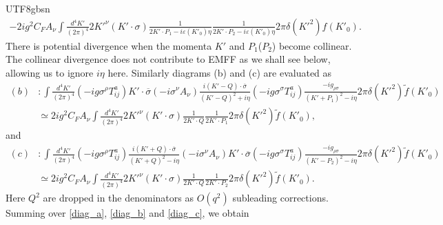 \documentclass[11pt]{article}\def\baselinestretch{1.4}
\def\h{\eta}
\begin{document}
\begin{CJK}{UTF8}{gbsn}
\begin{align}\label{diag_a}
   -2ig^2C_F A_\nu \int\frac{d^{4} K'}{( 2\pi )^{4}} 2K'^\nu (K' \cdot \sigma) \frac{1}{2K'\cdot P_1-i \varepsilon(K'_0)\eta}\frac{1}{2K'\cdot P_2-i \varepsilon(K'_0)\eta}2\pi \delta (K'^2)f(K'_0).
\end{align}
There is potential divergence when the momenta $K'$ and $P_1$($P_2$) become collinear. The collinear divergence does not contribute to EMFF as we shall see below, allowing us to ignore $i\h$ here. Similarly diagrams (b) and (c) are evaluated as
\begin{align}\label{diag_b}
   (b)&:\int \frac{d^{4} K'}{( 2\pi )^{4}}\left( -ig\sigma ^{\rho } T_{ij}^{a}\right)K' \cdot \overline{\sigma}\left( -i\sigma ^{\nu } A_{\nu }\right)\frac{i(K'-Q) \cdot \overline{\sigma }}{(K'-Q)^{2}+i \eta }\left( -ig\sigma ^{\sigma } T_{ij}^{a}\right)\frac{-ig_{\rho \sigma }}{(K'+P_1)^{2}-i \eta } 2\pi \delta \left( K'^{2}\right) \tilde{f}( K'_{0}) \nonumber\\
   &\simeq 2ig^2C_F A_\nu \int\frac{d^{4} K'}{( 2\pi )^{4}} 2K'^\nu (K' \cdot \sigma) \frac{1}{2K'\cdot Q}\frac{1}{2K'\cdot P_1}2\pi \delta (K'^2)\tilde{f}(K'_0),
\end{align}
and
\begin{align}\label{diag_c}
   (c)&:\int \frac{d^{4} K'}{( 2\pi )^{4}}\left( -ig\sigma ^{\rho } T_{ij}^{a}\right)\frac{i(K'+Q) \cdot \overline{\sigma }}{(K'+Q)^{2}-i \eta }\left( -i\sigma ^{\nu } A_{\nu }\right) K' \cdot \overline{\sigma} \left( -ig\sigma ^{\sigma } T_{ij}^{a}\right)\frac{-ig_{\rho \sigma }}{(K'-P_2)^{2}-i \eta } 2\pi \delta \left( K'^{2}\right) \tilde{f}( K'_{0}) \nonumber\\
   &\simeq 2ig^2C_F A_\nu \int\frac{d^{4} K'}{( 2\pi )^{4}} 2K'^\nu (K' \cdot \sigma) \frac{1}{2K'\cdot Q}\frac{1}{2K'\cdot P_2}2\pi \delta (K'^2)\tilde{f}(K'_0).
\end{align}
Here $Q^2$ are dropped in the denominators as $O(q^2)$ subleading corrections.
Summing over \eqref{diag_a}, \eqref{diag_b} and \eqref{diag_c}, we obtain

\end{CJK}
\end{document}
